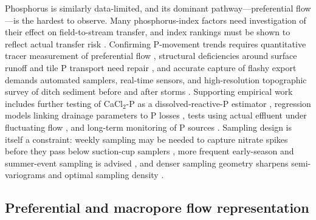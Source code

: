 Phosphorus is similarly data-limited, and its dominant pathway---preferential
flow---is the hardest to observe. Many phosphorus-index factors need
investigation of their effect on field-to-stream transfer, and index rankings
must be shown to reflect actual transfer risk
\parencite{Bechmann2007,Beauchemin2003}. Confirming P-movement trends requires
quantitative tracer measurement of preferential flow
\parencite{Salazar2011,Tiemeyer2009}, structural deficiencies around surface
runoff and tile P transport need repair \parencite{Apostel2021}, and accurate
capture of flashy export demands automated samplers, real-time sensors, and
high-resolution topographic survey of ditch sediment before and after storms
\parencite{Dialameh2022,Warsta2014}. Supporting empirical work includes further
testing of CaCl$_2$-P as a dissolved-reactive-P estimator \parencite{McDowell2001b},
regression models linking drainage parameters to P losses \parencite{Morrison2013},
tests using actual effluent under fluctuating flow \parencite{Sanford2016}, and
long-term monitoring of P sources \parencite{Jia2012}. Sampling design is itself
a constraint: weekly sampling may be needed to capture nitrate spikes before
they pass below suction-cup samplers \parencite{Zotarelli2007}, more frequent
early-season and summer-event sampling is advised
\parencite{Kalita1998,Tiemeyer2009}, and denser sampling geometry sharpens
semi-variograms and optimal sampling density \parencite{GALLICHAND1992,Upadhyay2019}.

\subsection{Preferential and macropore flow representation}

